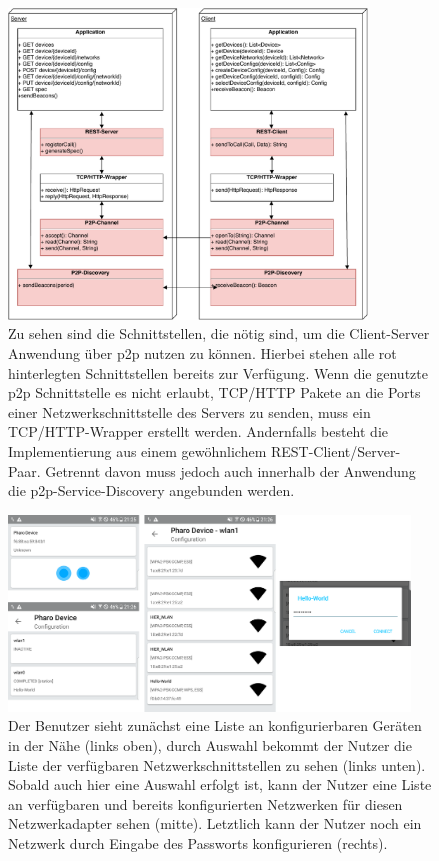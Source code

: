 \documentclass[12pt,a4paper]{article}
\begin{document}
	\begin{figure}[ht]
		\centering
	    \includegraphics[width=0.85\textwidth]{IOT-Connectivity-Protocol-Stack}
    	\caption{Zu sehen sind die Schnittstellen, die nötig sind, um die Client-Server Anwendung über p2p nutzen zu können. Hierbei stehen alle rot hinterlegten Schnittstellen bereits zur Verfügung. Wenn die genutzte p2p Schnittstelle es nicht erlaubt, TCP/HTTP Pakete an die Ports einer Netzwerkschnittstelle des Servers zu senden, muss ein TCP/HTTP-Wrapper erstellt werden. Andernfalls besteht die Implementierung aus einem gewöhnlichem REST-Client/Server-Paar. Getrennt davon muss jedoch auch innerhalb der Anwendung die p2p-Service-Discovery angebunden werden. }
	    \label{protocol_stack}
	\end{figure}     
    
    
    
    \begin{figure}[ht]
		\centering
	    \includegraphics[width=0.95\textwidth]{user_flow.png}
    	\caption{ Der Benutzer sieht zunächst eine Liste an konfigurierbaren Geräten in der Nähe (links oben), durch Auswahl bekommt der Nutzer die Liste der verfügbaren Netzwerkschnittstellen zu sehen (links unten). Sobald auch hier eine Auswahl erfolgt ist, kann der Nutzer eine Liste an verfügbaren und bereits konfigurierten Netzwerken für diesen Netzwerkadapter sehen (mitte). Letztlich kann der Nutzer noch ein Netzwerk durch Eingabe des Passworts konfigurieren (rechts). }
	    \label{user_flow}
	\end{figure}
	
\end{document}

